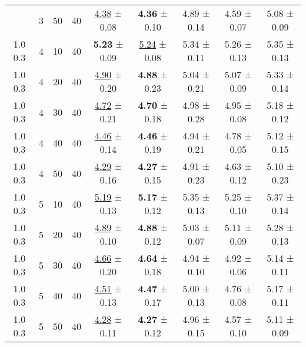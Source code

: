 \begin{tabular}{ccccccccc}
\begin{tabular}{lllllllll}
1.0 0.3 & 3 & 50 & 40 & \underline{4.38} ± 0.08 &    \textbf{4.36} ± 0.10 & 4.89 ± 0.14 & 4.59 ± 0.07 & 5.08 ± 0.09 \\
1.0 0.3 & 4 & 10 & 40 &    \textbf{5.23} ± 0.09 & \underline{5.24} ± 0.08 & 5.34 ± 0.11 & 5.26 ± 0.13 & 5.35 ± 0.13 \\
1.0 0.3 & 4 & 20 & 40 & \underline{4.90} ± 0.20 &    \textbf{4.88} ± 0.23 & 5.04 ± 0.21 & 5.07 ± 0.09 & 5.33 ± 0.14 \\
1.0 0.3 & 4 & 30 & 40 & \underline{4.72} ± 0.21 &    \textbf{4.70} ± 0.18 & 4.98 ± 0.28 & 4.95 ± 0.08 & 5.18 ± 0.12 \\
1.0 0.3 & 4 & 40 & 40 & \underline{4.46} ± 0.14 &    \textbf{4.46} ± 0.19 & 4.94 ± 0.21 & 4.78 ± 0.05 & 5.12 ± 0.15 \\
1.0 0.3 & 4 & 50 & 40 & \underline{4.29} ± 0.16 &    \textbf{4.27} ± 0.15 & 4.91 ± 0.23 & 4.63 ± 0.12 & 5.10 ± 0.23 \\
1.0 0.3 & 5 & 10 & 40 & \underline{5.19} ± 0.13 &    \textbf{5.17} ± 0.12 & 5.35 ± 0.13 & 5.25 ± 0.10 & 5.37 ± 0.14 \\
1.0 0.3 & 5 & 20 & 40 & \underline{4.89} ± 0.10 &    \textbf{4.88} ± 0.12 & 5.03 ± 0.07 & 5.11 ± 0.09 & 5.28 ± 0.13 \\
1.0 0.3 & 5 & 30 & 40 & \underline{4.66} ± 0.20 &    \textbf{4.64} ± 0.18 & 4.94 ± 0.10 & 4.92 ± 0.06 & 5.14 ± 0.11 \\
1.0 0.3 & 5 & 40 & 40 & \underline{4.51} ± 0.13 &    \textbf{4.47} ± 0.17 & 5.00 ± 0.13 & 4.76 ± 0.08 & 5.17 ± 0.11 \\
1.0 0.3 & 5 & 50 & 40 & \underline{4.28} ± 0.11 &    \textbf{4.27} ± 0.12 & 4.96 ± 0.15 & 4.57 ± 0.10 & 5.11 ± 0.09 \\
\bottomrule
\end{tabular}
